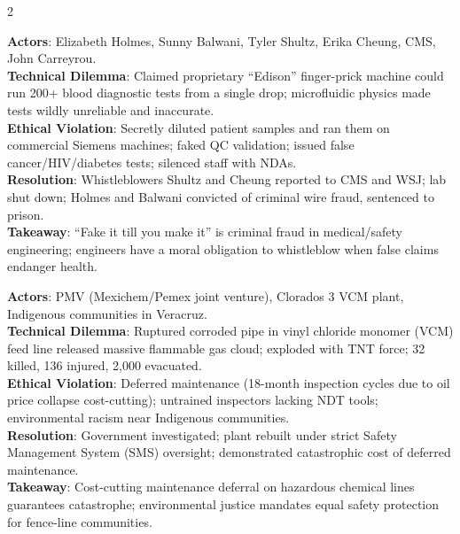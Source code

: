 \documentclass[9pt,a4paper]{extarticle}
\begin{document}
\begin{multicols}{2}
\begin{tcolorbox}[casebox,title={19. Theranos Medical Diagnostic Fraud}]
\textbf{Actors}: Elizabeth Holmes, Sunny Balwani, Tyler Shultz, Erika Cheung, CMS, John Carreyrou.\\
\textbf{Technical Dilemma}: Claimed proprietary ``Edison'' finger-prick machine could run 200+ blood diagnostic tests from a single drop; microfluidic physics made tests wildly unreliable and inaccurate.\\
\textbf{Ethical Violation}: Secretly diluted patient samples and ran them on commercial Siemens machines; faked QC validation; issued false cancer/HIV/diabetes tests; silenced staff with NDAs.\\
\textbf{Resolution}: Whistleblowers Shultz and Cheung reported to CMS and WSJ; lab shut down; Holmes and Balwani convicted of criminal wire fraud, sentenced to prison.\\
\textbf{Takeaway}: ``Fake it till you make it'' is criminal fraud in medical/safety engineering; engineers have a moral obligation to whistleblow when false claims endanger health.
\end{tcolorbox}

\begin{tcolorbox}[casebox,title={20. Coatzacoalcos Petrochemical Blast (2016)}]
\textbf{Actors}: PMV (Mexichem/Pemex joint venture), Clorados 3 VCM plant, Indigenous communities in Veracruz.\\
\textbf{Technical Dilemma}: Ruptured corroded pipe in vinyl chloride monomer (VCM) feed line released massive flammable gas cloud; exploded with TNT force; 32 killed, 136 injured, 2,000 evacuated.\\
\textbf{Ethical Violation}: Deferred maintenance (18-month inspection cycles due to oil price collapse cost-cutting); untrained inspectors lacking NDT tools; environmental racism near Indigenous communities.\\
\textbf{Resolution}: Government investigated; plant rebuilt under strict Safety Management System (SMS) oversight; demonstrated catastrophic cost of deferred maintenance.\\
\textbf{Takeaway}: Cost-cutting maintenance deferral on hazardous chemical lines guarantees catastrophe; environmental justice mandates equal safety protection for fence-line communities.
\end{tcolorbox}


\end{multicols}
\end{document}
